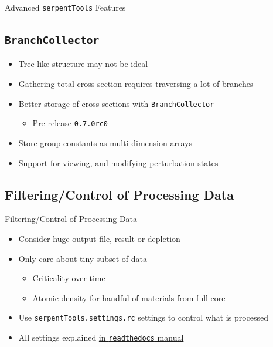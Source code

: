 \documentclass{beamer}
\newcommand{\st}{\texttt{serpentTools} }
\begin{document}
\begin{frame}{Advanced \st Features}
    \tableofcontents[sectionstyle=show/hide,subsectionstyle=show/show/hide]
\end{frame}

\subsection{\texttt{BranchCollector}}

\begin{frame}{}
    \begin{itemize}
        \item{Tree-like structure may not be ideal}
        \item Gathering total cross section requires traversing a lot of branches
        \item{Better storage of cross sections with \texttt{BranchCollector}}
        \begin{itemize}
            \item Pre-release \texttt{0.7.0rc0}
        \end{itemize}
        \item{Store group constants as multi-dimension arrays}
        \item{Support for viewing, and modifying perturbation states}
    \end{itemize}
\end{frame}

\subsection{Filtering/Control of Processing Data}

\begin{frame}{Filtering/Control of Processing Data}
    \begin{itemize}
        \item Consider huge output file, result or depletion
        \item Only care about tiny subset of data
        \begin{itemize}
            \item Criticality over time
            \item Atomic density for handful of materials from full core
        \end{itemize}
        \item Use \texttt{serpentTools.settings.rc} settings to control what is processed
        \item{All settings explained \href{https://serpent-tools.readthedocs.io/en/latest/settingsTop.html}{in \texttt{readthedocs} manual}}
    \end{itemize}
\end{frame}
\end{document}
